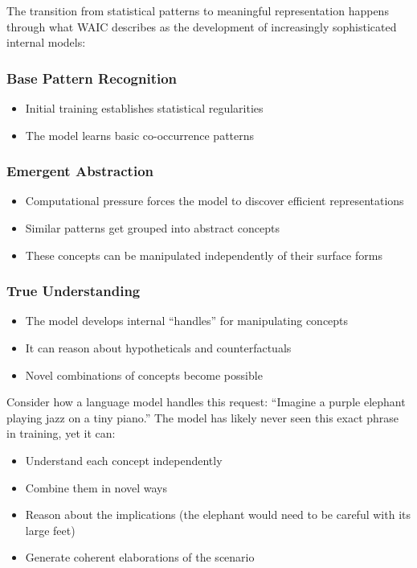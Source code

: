 \documentclass[12pt]{article}
\begin{document}
The transition from statistical patterns to meaningful representation happens through what WAIC describes as the development of increasingly sophisticated internal models:

\subsubsection{Base Pattern Recognition}
\begin{itemize}
    \item Initial training establishes statistical regularities
    \item The model learns basic co-occurrence patterns
\end{itemize}

\subsubsection{Emergent Abstraction}
\begin{itemize}
    \item Computational pressure forces the model to discover efficient representations
    \item Similar patterns get grouped into abstract concepts
    \item These concepts can be manipulated independently of their surface forms
\end{itemize}

\subsubsection{True Understanding}
\begin{itemize}
    \item The model develops internal ``handles'' for manipulating concepts
    \item It can reason about hypotheticals and counterfactuals
    \item Novel combinations of concepts become possible
\end{itemize}

Consider how a language model handles this request: ``Imagine a purple elephant playing jazz on a tiny piano.'' The model has likely never seen this exact phrase in training, yet it can:
\begin{itemize}
    \item Understand each concept independently
    \item Combine them in novel ways
    \item Reason about the implications (the elephant would need to be careful with its large feet)
    \item Generate coherent elaborations of the scenario
\end{itemize}
\end{document}

